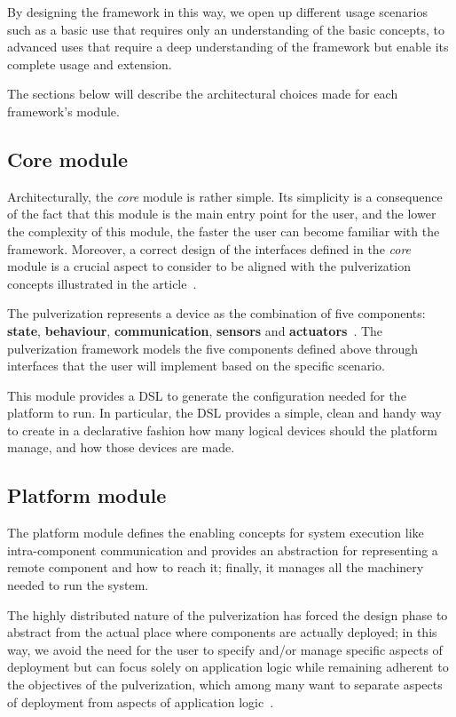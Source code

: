 By designing the framework in this way, we open up different usage scenarios such as a basic use that requires only an understanding of the
basic concepts, to advanced uses that require a deep understanding of the framework but enable its complete usage and extension.


The sections below will describe the architectural choices made for each framework's module.

\subsection{Core module}
\label{sec:core-module}

Architecturally, the \emph{core} module is rather simple. Its simplicity is a consequence of the fact that this module is the main entry point
for the user, and the lower the complexity of this module, the faster the user can become familiar with the framework.
Moreover, a correct design of the interfaces defined in the \emph{core} module is a crucial aspect to consider to be aligned with the
pulverization concepts illustrated in the article~\cite{fi12110203}.

The pulverization represents a device as the combination of five components: \textbf{state}, \textbf{behaviour}, \textbf{communication},
\textbf{sensors} and \textbf{actuators}~\cite{fi12110203}.
The pulverization framework models the five components defined above through interfaces that the user will implement based on the specific scenario.

This module provides a DSL to generate the configuration needed for the platform to run. In particular, the DSL provides a simple, clean and handy
way to create in a declarative fashion how many logical devices should the platform manage, and how those devices are made.

\subsection{Platform module}
\label{sec:platform-module}

The platform module defines the enabling concepts for system execution like intra-component communication and provides an abstraction for
representing a remote component and how to reach it; finally, it manages all the machinery needed to run the system.

The highly distributed nature of the pulverization has forced the design phase to abstract from the actual place where components are actually
deployed; in this way, we avoid the need for the user to specify and/or manage specific aspects of deployment but can focus solely on
application logic while remaining adherent to the objectives of the pulverization, which among many want to separate aspects of 
deployment from aspects of application logic~\cite{fi12110203}.

